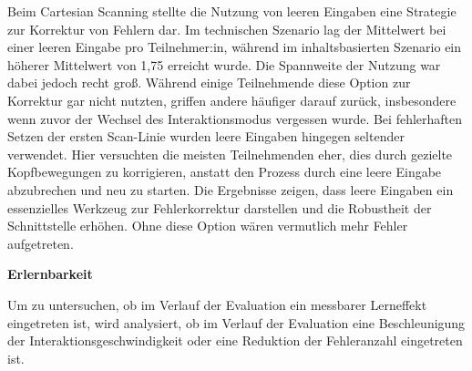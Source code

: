 Beim Cartesian Scanning stellte die Nutzung von leeren Eingaben eine Strategie zur Korrektur von Fehlern dar. Im technischen Szenario lag der Mittelwert bei einer leeren Eingabe pro Teilnehmer:in, während im inhaltsbasierten Szenario ein höherer Mittelwert von 1,75 erreicht wurde. Die Spannweite der Nutzung war dabei jedoch recht groß. Während einige Teilnehmende diese Option zur Korrektur gar nicht nutzten, griffen andere häufiger darauf zurück, insbesondere wenn zuvor der Wechsel des Interaktionsmodus vergessen wurde. Bei fehlerhaften Setzen der ersten Scan-Linie wurden leere Eingaben hingegen seltender verwendet. Hier versuchten die meisten Teilnehmenden eher, dies durch gezielte Kopfbewegungen zu korrigieren, anstatt den Prozess durch eine leere Eingabe abzubrechen und neu zu starten. 
Die Ergebnisse zeigen, dass leere Eingaben ein essenzielles Werkzeug zur Fehlerkorrektur darstellen und die Robustheit der Schnittstelle erhöhen. Ohne diese Option wären vermutlich mehr Fehler aufgetreten. 

\textbf{Erlernbarkeit}

Um zu untersuchen, ob im Verlauf der Evaluation ein messbarer Lerneffekt eingetreten ist, wird analysiert, ob im Verlauf der Evaluation eine Beschleunigung der Interaktionsgeschwindigkeit oder eine Reduktion der Fehleranzahl eingetreten ist.


